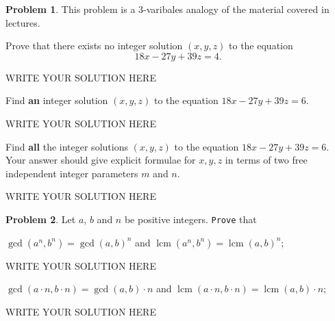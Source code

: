 \documentclass[11pt]{article}
\theoremstyle{plain}
\theoremstyle{definition}
\newtheorem{problem}{Problem}
\theoremstyle{remark}
\numberwithin{equation}{problem}
\DeclareMathOperator*\lcm{lcm}
\begin{document}
\begin{problem}
	This problem is a $3$-varibales analogy of the material covered in lectures.
	\begin{listinprob}
		\item Prove that there exists no integer solution $(x, y, z)$ to the equation 
		\[
			18x - 27y + 39z = 4.
		\]
	\end{listinprob}
\begin{solution} %
WRITE YOUR SOLUTION HERE
\end{solution}\clearpage %
	\begin{listinprob}[resume]
		\item Find \textbf{an} integer solution $(x, y, z)$ to the equation $18x - 27y + 39z = 6$. 
	\end{listinprob}
\begin{solution} %
WRITE YOUR SOLUTION HERE
\end{solution}\clearpage %
	\begin{listinprob}[resume]
		\item Find \textbf{all} the integer solutions $(x, y, z)$ to the equation $18x - 27y + 39z = 6$. 
		Your answer should give explicit formulae for $x, y, z$ in terms of two free independent integer parameters $m$ and $n$.
	\end{listinprob}
\end{problem}
\begin{solution} %
WRITE YOUR SOLUTION HERE
\end{solution}\clearpage %

\begin{problem}
	Let $a$, $b$ and $n$ be positive integers. \texttt{Prove} that 
	\begin{listinprob}
		\item $\gcd(a^n,b^n) = \gcd(a,b)^n$ and $\lcm(a^n,b^n) = \lcm(a,b)^n$;
	\end{listinprob}
\begin{solution} %
WRITE YOUR SOLUTION HERE
\end{solution}\clearpage %
	\begin{listinprob}[resume]
		\item $\gcd(a\cdot n,b\cdot n) = \gcd(a,b)\cdot n$ and $\lcm(a\cdot n,b\cdot n) = \lcm(a,b)\cdot n$;
	\end{listinprob}
\end{problem}
\begin{solution} %
WRITE YOUR SOLUTION HERE
\end{solution}\clearpage %
\end{document}
